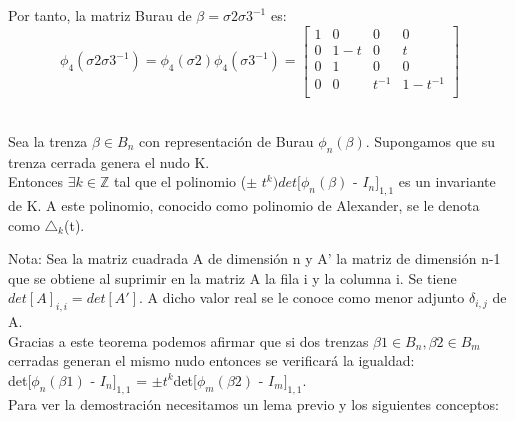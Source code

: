  Por tanto, la matriz Burau de $\beta = \sigma2\sigma3^{-1}$ es:
 \[ \phi_{4} (\sigma2\sigma3^{-1}) = \phi_{4} (\sigma2) \phi_{4}(\sigma3^{-1}) = \begin{bmatrix}
 1 & 0 & 0 & 0 \\
 0 & 1-t & 0 & t \\
 0 & 1 & 0 & 0  \\	
 0 & 0 & t^{-1} & 1-t^{-1} \\
 \end{bmatrix}\]\\
 
 
\begin{teo}\label{teoalex}
	Sea la trenza $\beta \in B_{n}$ con representación de Burau $\phi_{n}(\beta)$. Supongamos que su trenza cerrada genera el nudo K.\\
    Entonces $\exists k \in \mathds{Z}$ tal que el polinomio ($ \pm $ $ t^{k} )det[\phi_{n}(\beta)$ - $ I_{n} $$ ]_{1,1} $ es un invariante de K. A este polinomio, conocido como polinomio de Alexander, se le denota como $ \triangle_{k} $(t).
\end{teo}

Nota: Sea la matriz cuadrada A de dimensión n y A' la matriz de dimensión n-1 que se obtiene al suprimir en la matriz A la fila i y la columna i. 
Se tiene $ det[A]_{i,i}=det[A'] $. A dicho valor real se le conoce como menor adjunto $\delta_{i,j}$ de A.  \\ 

Gracias a este teorema podemos afirmar que si dos trenzas $\beta1 \in B_{n}, \beta2 \in B_{m}$ cerradas generan el mismo nudo entonces se verificará la igualdad:\\
det[$\phi_{n}(\beta1)$ - $ I_{n} $$ ]_{1,1}$ = $ \pm t^{k} $det[$\phi_{m}(\beta2)$ - $ I_{m} $$ ]_{1,1}$.\\

Para ver la demostración necesitamos un lema previo y los siguientes conceptos:\\

